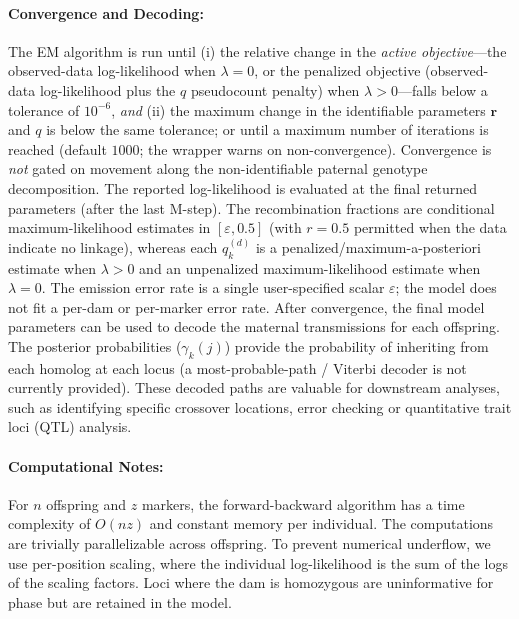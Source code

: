 \documentclass[11pt]{article}
\begin{document}
\paragraph{Convergence and Decoding:} The EM algorithm is run until (i) the relative change in the \emph{active objective}---the observed-data log-likelihood when $\lambda=0$, or the penalized objective (observed-data log-likelihood plus the $q$ pseudocount penalty) when $\lambda>0$---falls below a tolerance of $10^{-6}$, \emph{and} (ii) the maximum change in the identifiable parameters $\mathbf r$ and $q$ is below the same tolerance; or until a maximum number of iterations is reached (default $1000$; the wrapper warns on non-convergence). Convergence is \emph{not} gated on movement along the non-identifiable paternal genotype decomposition. The reported log-likelihood is evaluated at the final returned parameters (after the last M-step). The recombination fractions are conditional maximum-likelihood estimates in $[\varepsilon, 0.5]$ (with $r=0.5$ permitted when the data indicate no linkage), whereas each $q_k^{(d)}$ is a penalized/maximum-a-posteriori estimate when $\lambda>0$ and an unpenalized maximum-likelihood estimate when $\lambda=0$. The emission error rate is a single user-specified scalar $\varepsilon$; the model does not fit a per-dam or per-marker error rate. After convergence, the final model parameters can be used to decode the maternal transmissions for each offspring. The posterior probabilities ($\gamma_k(j)$) provide the probability of inheriting from each homolog at each locus (a most-probable-path / Viterbi decoder is not currently provided). These decoded paths are valuable for downstream analyses, such as identifying specific crossover locations, error checking or quantitative trait loci (QTL) analysis.

\paragraph{Computational Notes:} For $n$ offspring and $z$ markers, the forward-backward algorithm has a time complexity of $O(nz)$ and constant memory per individual. The computations are trivially parallelizable across offspring. To prevent numerical underflow, we use per-position scaling, where the individual log-likelihood is the sum of the logs of the scaling factors. Loci where the dam is homozygous are uninformative for phase but are retained in the model.
\end{document}
